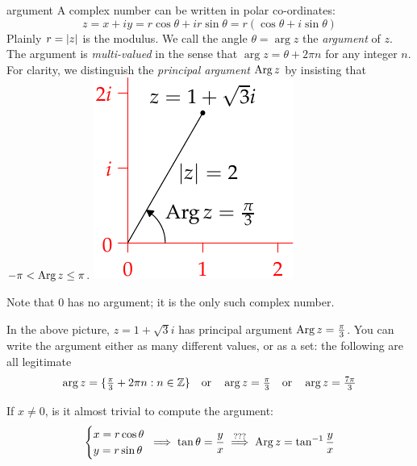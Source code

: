 \begin{defn}[lower separated=false, sidebyside, sidebyside align=top seam, sidebyside gap=0pt, righthand width=0.25\linewidth]{}{argument}
	A complex number can be written in polar co-ordinates:
	\[
		z=x+iy =r\cos\theta+ir\sin\theta =r(\cos\theta+i\sin\theta)
	\]
	Plainly $r=\left| z\right|$ is the modulus. We call the angle $\theta=\arg z$ the \emph{argument} of $z$.\smallbreak
	The argument is \emph{multi-valued} in the sense that $\arg z=\theta+2\pi n$ for any integer $n$. For clarity, we distinguish the \emph{principal argument} $\operatorname{Arg} z$ by insisting that $-\pi<\operatorname{Arg} z\le \pi$.
	\tcblower
	\flushright\includegraphics[scale=0.9]{intro-modulus2}
\end{defn}

Note that 0 has no argument; it is the only such complex number.

\begin{example}{}{}
	In the above picture, $z=1+\sqrt 3 i$ has principal argument $\operatorname{Arg} z=\frac\pi 3$. You can write the argument either as many different values, or as a set:\footnotemark{} the following are all legitimate
	\[
		\arg z=\{\tfrac\pi 3+2\pi n:n\in\mathbb{Z}\}\quad\text{or}\quad \arg z=\tfrac\pi 3\quad\text{or}\quad \arg z=\tfrac{7\pi}3
	\]
\end{example}


If $x\neq 0$, is it almost trivial to compute the argument:
\[
	\begin{cases}
		x=r\cos\theta\\
		y=r\sin\theta
	\end{cases}
	\negthickspace\negthickspace\negthickspace
	\implies \tan\theta=\frac yx \overset{\text{???}}{\implies} \operatorname{Arg} z=\tan^{-1}\frac yx
\]

